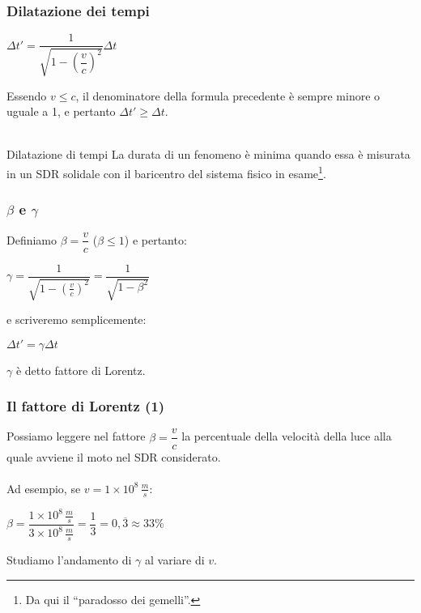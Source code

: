 \documentclass[]{beamer}
\theoremstyle{plain}
\begin{document}
\begin{frame}
  \frametitle{Dilatazione dei tempi}
\begin{small}
    \begin{center}
\colorbox{marroncino!30}{$ \Delta t' = \dfrac{1}{\sqrt{1- \left( \dfrac{v}{c} \right)^2 }}\Delta t $}
  \end{center}
  \end{small}
  Essendo $ v \leq c $, il denominatore della formula precedente è sempre minore o uguale a 1, e pertanto $ \Delta t' \geq \Delta t $.\\~\pause
  \begin{block}{Dilatazione di tempi}
    La durata di un fenomeno è minima quando essa è misurata in un SDR solidale con il baricentro del sistema fisico in esame\footnote{Da qui il ``paradosso dei gemelli''.}.
  \end{block}
\end{frame}


\begin{frame}
  \frametitle{$ \beta $ e $ \gamma $}
  Definiamo \colorbox{marroncino!30}{$ \beta = \dfrac{v}{c} $} ($ \beta \leq 1 $){\pause} e pertanto:
\begin{center}
  \colorbox{marroncino!30}{$ \gamma = \dfrac{1}{\sqrt{1- \left( \frac{v}{c} \right)^2 }} = \dfrac{1}{\sqrt{1 - \beta^2}} $}
\end{center}
{\pause}e scriveremo semplicemente:
  \begin{center}
  \colorbox{marroncino!30}{$ \Delta t' = \gamma\Delta t $}
  \end{center}
  $ \gamma $ è detto \alert{fattore di Lorentz}.
\end{frame}


\begin{frame}
  \frametitle{Il fattore di Lorentz (1)}
  Possiamo leggere nel fattore $ \beta = \dfrac{v}{c} $ la percentuale della velocità della luce alla quale avviene il moto nel SDR considerato.{\pause}\\~\\  
  Ad esempio, se $ v = 1 \times 10^8 \, \frac{m}{s} $:
  \begin{center}
  $ \beta = \dfrac{1 \times 10^8 \, \frac{m}{s}}{3 \times 10^8 \, \frac{m}{s}} = \dfrac{1}{3} = 0,\overline{3} \approx 33 \% $
  \end{center}
  {\pause}
  Studiamo l'andamento di $ \gamma $ al variare di $ v $.
\end{frame}
\end{document}
